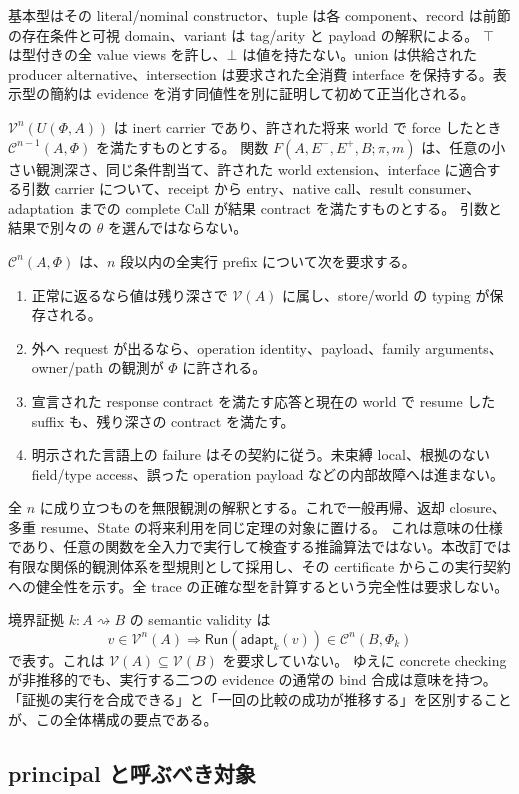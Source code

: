 \documentclass[11pt,a4paper]{article}
\theoremstyle{remark}
\newcommand{\Run}{\mathsf{Run}}
\newcommand{\adap}{\rightsquigarrow}
\begin{document}
基本型はその literal/nominal constructor、tuple は各 component、record は前節の存在条件と可視 domain、variant は tag/arity と payload の解釈による。
$\top$ は型付きの全 value views を許し、$\bot$ は値を持たない。union は供給された producer alternative、intersection は要求された全消費 interface を保持する。表示型の簡約は evidence を消す同値性を別に証明して初めて正当化される。

$\mathcal V^n(U(\Phi,A))$ は inert carrier であり、許された将来 world で force したとき $\mathcal C^{n-1}(A,\Phi)$ を満たすものとする。
関数 $F(A,E^-,E^+,B;\pi,m)$ は、任意の小さい観測深さ、同じ条件割当て、許された world extension、interface に適合する引数 carrier について、receipt から entry、native call、result consumer、adaptation までの complete Call が結果 contract を満たすものとする。
引数と結果で別々の $\theta$ を選んではならない。

$\mathcal C^n(A,\Phi)$ は、$n$ 段以内の全実行 prefix について次を要求する。
\begin{enumerate}
\item 正常に返るなら値は残り深さで $\mathcal V(A)$ に属し、store/world の typing が保存される。
\item 外へ request が出るなら、operation identity、payload、family arguments、owner/path の観測が $\Phi$ に許される。
\item 宣言された response contract を満たす応答と現在の world で resume した suffix も、残り深さの contract を満たす。
\item 明示された言語上の failure はその契約に従う。未束縛 local、根拠のない field/type access、誤った operation payload などの内部故障へは進まない。
\end{enumerate}
全 $n$ に成り立つものを無限観測の解釈とする。これで一般再帰、返却 closure、多重 resume、State の将来利用を同じ定理の対象に置ける。
これは意味の仕様であり、任意の関数を全入力で実行して検査する推論算法ではない。本改訂では有限な関係的観測体系を型規則として採用し、その certificate からこの実行契約への健全性を示す。全 trace の正確な型を計算するという完全性は要求しない。

境界証拠 $k:A\adap B$ の semantic validity は
\[
v\in\mathcal V^n(A)\Longrightarrow
\Run(\mathsf{adapt}_k(v))\in\mathcal C^n(B,\Phi_k)
\]
で表す。これは $\mathcal V(A)\subseteq\mathcal V(B)$ を要求していない。
ゆえに concrete checking が非推移的でも、実行する二つの evidence の通常の bind 合成は意味を持つ。
「証拠の実行を合成できる」と「一回の比較の成功が推移する」を区別することが、この全体構成の要点である。

\subsection{principal と呼ぶべき対象}
\end{document}
